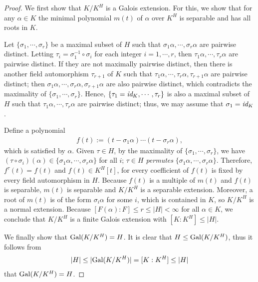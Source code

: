 \begin{proof}
    We first show that $K/K^H$ is a Galois extension.
    For this, we show that for any $\alpha\in K$ the minimal polynomial $m(t)$ of $\alpha$ over $K^H$ is separable and has all roots in $K$.
    
    \color{magenta}Let $\{\sigma_1, \cdots, \sigma_r\}$ be a maximal subset of $H$ such that $\sigma_1\alpha, \cdots, \sigma_r\alpha$ are pairwise distinct. \color{black}
    Letting $\tau_i=\sigma_1^{-1}\circ\sigma_i$ for each integer $i=1, \cdots, r$, then $\tau_1\alpha, \cdots, \tau_r\alpha$ are pairwise distinct.
    If they are not maximally pairwise distinct, then there is another field automorphism $\tau_{r+1}$ of $K$ such that $\tau_1\alpha, \cdots, \tau_r\alpha, \tau_{r+1}\alpha$ are pairwise distinct; then $\sigma_1\alpha, \cdots, \sigma_r\alpha, \sigma_{r+1}\alpha$ are also pairwise distinct, which contradicts the maximality of $\{\sigma_1, \cdots, \sigma_r\}$.
    Hence, $\{\tau_1=\textit{id}_{K}, \cdots, \tau_r\}$ is also a maximal subset of $H$ such that $\tau_1\alpha, \cdots, \tau_r\alpha$ are pairwise distinct; thus, we may assume that $\sigma_1=\textit{id}_{K}$.

    Define a polynomial
    \begin{align*}
        f(t):=(t-\sigma_1\alpha)\cdots(t-\sigma_r\alpha),
    \end{align*}
    which is satisfied by $\alpha$.
    Given $\tau\in H$, by the maximality of $\{\sigma_1, \cdots, \sigma_r\}$, we have $(\tau\circ\sigma_i)(\alpha)\in\{\sigma_1\alpha, \cdots, \sigma_r\alpha\}$ for all $i$; $\tau\in H$ \textit{permutes} $\{\sigma_1\alpha, \cdots, \sigma_r\alpha\}$.
    Therefore, $f^\tau(t)=f(t)$ and $f(t)\in K^H[t]$, for every coefficient of $f(t)$ is fixed by every field automorphism in $H$.
    Because $f(t)$ is a multiple of $m(t)$ and $f(t)$ is separable, $m(t)$ is separable and $K/K^H$ is a separable extension.
    Moreover, a root of $m(t)$ is of the form $\sigma_i\alpha$ for some $i$, which is contained in $K$, so $K/K^H$ is a normal extension.
    Because $[F(\alpha): F]\leq r\leq |H|<\infty$ for all $\alpha\in K$, we conclude that $K/K^H$ is a finite Galois extension with $[K:K^H]\leq |H|$.

    We finally show that ${\textrm{Gal}({K/K^H})}=H$.
    It is clear that $H\leq{\textrm{Gal}({K/K^H})}$, thus it follows from
    \begin{align*}
        |H|\leq|{\textrm{Gal}({K/K^H})}|=[K:K^H]\leq|H|
    \end{align*}
    that ${\textrm{Gal}({K/K^H})}=H$.
\end{proof}